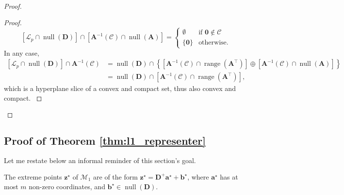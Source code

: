\begin{proof}
\begin{proof}
{\begin{equation*}
                        \left [ \mathcal{L}_p \cap \operatorname{null} \left( \mathbf{D} \right) \right ] \cap \left [ \mathbf{A}^{-1}(\mathcal{C}) \cap \operatorname{null} \left ( \mathbf{A} \right ) \right ] = \left \{
                        \begin{matrix}
                            \emptyset & \text{if } \mathbf{0} \notin \mathcal{C} \\
                            \{ \mathbf{0} \} & \text{otherwise}.
                        \end{matrix}
                        \right.
                    \end{equation*}
                    In any case,
                    \begin{align*}
                        \left [ \mathcal{L}_p \cap \operatorname{null} \left( \mathbf{D} \right) \right ] \cap \mathbf{A}^{-1}(\mathcal{C}) & = \operatorname{null} \left( \mathbf{D} \right) \cap \left \{ \left [ \mathbf{A}^{-1}(\mathcal{C}) \cap \operatorname{range} \left( \mathbf{A}^\top \right) \right ] \oplus \left [ \mathbf{A}^{-1}(\mathcal{C}) \cap \operatorname{null} \left ( \mathbf{A} \right ) \right ] \right \}\\
                        & = \operatorname{null} \left( \mathbf{D} \right) \cap \left [ \mathbf{A}^{-1}(\mathcal{C}) \cap \operatorname{range} \left( \mathbf{A}^\top \right) \right ],
                    \end{align*}
                    which is a hyperplane slice of a convex and compact set, thus also convex and compact.
                }
                \qedsymbol
            \end{proof}
        \qedstep
\end{proof}


\subsection{Proof of Theorem \ref{thm:l1_representer}}\label{ap:representer_l1}

Let me restate below an informal reminder of this section's goal.

\begin{claim}
    The extreme points $\mathbf{z}^\star$ of $\mathcal{M}_1$ are of the form $\mathbf{z}^\star = \mathbf{D}^+ \mathbf{a}^\star + \mathbf{b}^\star$, where $\mathbf{a}^\star$ has at most $m$ non-zero coordinates, and $\mathbf{b}^\star \in \operatorname{null} \left ( \mathbf{D} \right )$.
\end{claim}

